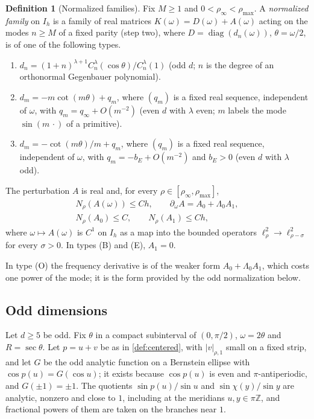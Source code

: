 \documentclass[11pt]{amsart}
\numberwithin{equation}{section}
\theoremstyle{definition}
\newtheorem{definition}[theorem]{Definition}
\theoremstyle{remark}
\newcommand{\Z}{\mathbb{Z}}
\newcommand{\abs}[1]{\lvert #1\rvert}
\begin{document}
\begin{definition}[Normalized families]\label{def:matrixclass}
Fix $M\ge1$ and $0<\rho_\infty<\rho_{\max}$. A \emph{normalized family} on $I_h$ is a family of real matrices $K(\omega)=D(\omega)+A(\omega)$ acting on the modes $n\ge M$ of a fixed parity (step two), where $D=\operatorname{diag}(d_n(\omega))$, $\theta=\omega/2$, is of one of the following types.
\begin{enumerate}[label=\textup{(\Roman*)}]
\item[\textup{(O)}] $d_n=(1+n)^{\lambda+1}C_n^\lambda(\cos\theta)/C_n^\lambda(1)$ (odd $d$; $n$ is the degree of an orthonormal Gegenbauer polynomial).
\item[\textup{(B)}] $d_m=-m\cot(m\theta)+q_m$, where $(q_m)$ is a fixed real sequence, independent of $\omega$, with $q_m=q_\infty+O(m^{-2})$ (even $d$ with $\lambda$ even; $m$ labels the mode $\sin(m\,\cdot)$ of a primitive).
\item[\textup{(E)}] $d_m=-\cot(m\theta)/m+q_m$, where $(q_m)$ is a fixed real sequence, independent of $\omega$, with $q_m=-b_E+O(m^{-2})$ and $b_E>0$ (even $d$ with $\lambda$ odd).
\end{enumerate}
The perturbation $A$ is real and, for every $\rho\in[\rho_\infty,\rho_{\max}]$,
\begin{equation}\label{eq:Aclass}
\begin{gathered}
N_\rho(A(\omega))\le Ch,\qquad\partial_\omega A=A_0+\Lambda_0A_1,\\
N_\rho(A_0)\le C,\qquad N_\rho(A_1)\le Ch,
\end{gathered}
\end{equation}
where $\omega\mapsto A(\omega)$ is $C^1$ on $I_h$ as a map into the bounded operators $\ell^2_\rho\to\ell^2_{\rho-\sigma}$ for every $\sigma>0$. In types (B) and (E), $A_1=0$.
\end{definition}

In type (O) the frequency derivative is of the weaker form $A_0+\Lambda_0A_1$, which costs one power of the mode; it is the form provided by the odd normalization below.

\subsection{Odd dimensions}
Let $d\ge5$ be odd. Fix $\theta$ in a compact subinterval of $(0,\pi/2)$, $\omega=2\theta$ and $R=\sec\theta$. Let $p=u+v$ be as in \cref{def:centered}, with $\abs v_{\rho,1}$ small on a fixed strip, and let $G$ be the odd analytic function on a Bernstein ellipse with $\cos p(u)=G(\cos u)$; it exists because $\cos p(u)$ is even and $\pi$-antiperiodic, and $G(\pm1)=\pm1$. The quotients $\sin p(u)/\sin u$ and $\sin\chi(y)/\sin y$ are analytic, nonzero and close to $1$, including at the meridians $u,y\in\pi\Z$, and fractional powers of them are taken on the branches near $1$.
\end{document}
